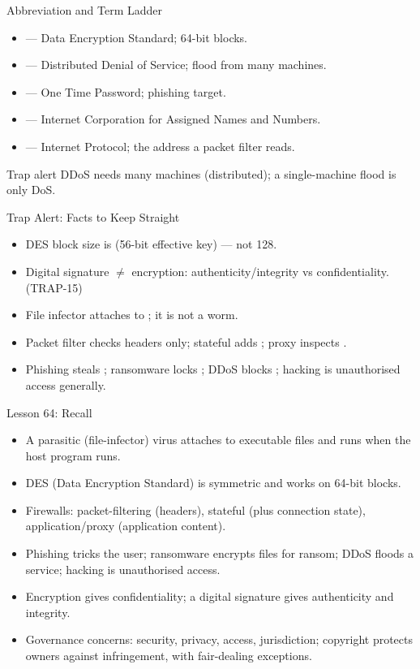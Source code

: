 \documentclass[aspectratio=169]{beamer}
\begin{document}
\begin{frame}{Abbreviation and Term Ladder}
  \begin{itemize}
    \item {} --- Data Encryption Standard; 64-bit blocks.
    \item {} --- Distributed Denial of Service; flood from many machines.
    \item {} --- One Time Password; phishing target.
    \item {} --- Internet Corporation for Assigned Names and Numbers.
    \item {} --- Internet Protocol; the address a packet filter reads.
  \end{itemize}
  \begin{alertblock}{Trap alert}
    DDoS needs many machines (distributed); a single-machine flood is only DoS.
  \end{alertblock}
\end{frame}

\begin{frame}{Trap Alert: Facts to Keep Straight}
  \begin{itemize}
    \item DES block size is  (56-bit effective key) --- not 128.
    \item Digital signature $\ne$ encryption: authenticity/integrity vs
      confidentiality. (TRAP-15)
    \item File infector attaches to ; it is not a worm.
    \item Packet filter checks headers only; stateful adds ; proxy inspects .
    \item Phishing steals ; ransomware locks ;
      DDoS blocks ; hacking is unauthorised access generally.
  \end{itemize}
\end{frame}

\begin{frame}{Lesson 64: Recall}
  \begin{itemize}
    \item A parasitic (file-infector) virus attaches to executable files and
      runs when the host program runs.
    \item DES (Data Encryption Standard) is symmetric and works on 64-bit blocks.
    \item Firewalls: packet-filtering (headers), stateful (plus connection
      state), application/proxy (application content).
    \item Phishing tricks the user; ransomware encrypts files for ransom; DDoS
      floods a service; hacking is unauthorised access.
    \item Encryption gives confidentiality; a digital signature gives
      authenticity and integrity.
    \item Governance concerns: security, privacy, access, jurisdiction;
      copyright protects owners against infringement, with fair-dealing exceptions.
  \end{itemize}
\end{frame}
\end{document}
